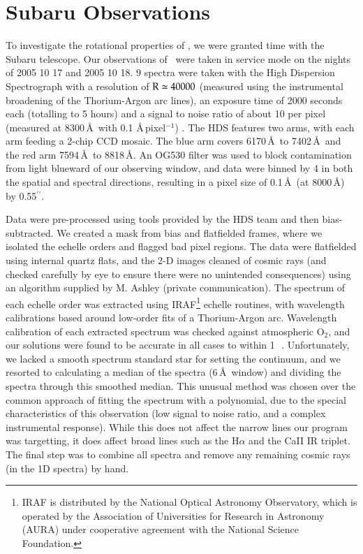 \section{Subaru Observations}
To investigate the rotational properties of \starg, we were granted time
with the Subaru telescope. Our observations of \starg\ were taken in
service mode on the nights of 2005 10 17 and 2005 10 18. 9
spectra were taken with the High Dispersion Spectrograph
\citep[HDS, ][]{1998SPIE.3355..354N} with a resolution of $\rm{R}\simeq40000$ (measured using the instrumental broadening of the Thorium-Argon arc lines), an
exposure time of 2000 seconds each (totalling to 5 hours) and a signal to noise ratio of about 10 per pixel (measured at $8300$\,\AA\ with 0.1 \AA\,pixel$^{-1}$) . The HDS
features two arms, with each arm feeding a 2-chip CCD mosaic. The blue
arm covers 6170\,\AA\ to 7402\,\AA\ and the red arm 7594\,\AA\ to
8818\,\AA. An OG530 filter was used to block contamination from light
blueward of our observing window, and data were binned by 4 in both
the spatial and spectral directions, resulting in a pixel size of
0.1\,\AA\ (at 8000\,\AA) by 0.55$^{\prime\prime}$.

Data were pre-processed using tools provided by the HDS team and then
bias-subtracted. We created a mask from bias and flatfielded frames,
where we isolated the echelle orders and flagged bad pixel
regions. The data were flatfielded using internal quartz flats, and the
2-D images cleaned of cosmic rays (and checked carefully by eye to
ensure there were no unintended consequences) using an algorithm
supplied by M. Ashley (private communication). The spectrum of each
echelle order was extracted using IRAF\footnote{IRAF is distributed by
the National Optical Astronomy Observatory, which is operated by the
Association of Universities for Research in Astronomy (AURA) under
cooperative agreement with the National Science Foundation.}  echelle
routines, with wavelength calibrations based around low-order fits of
a Thorium-Argon arc. Wavelength calibration of each extracted spectrum
was checked against atmospheric O$_2$, and our solutions were found to
be accurate in all cases to within 1\,\kms\
\citep{1985A&A...149..357C}. Unfortunately, we lacked a smooth
spectrum standard star for setting the continuum, and we resorted to
calculating a median of the spectra (6\,\AA\ window) and dividing the
spectra through this smoothed median. This unusual method was chosen
over the common approach of fitting the spectrum with a polynomial,
due to the special characteristics of this observation (low signal to noise ratio, and a complex instrumental response). While this does not affect the narrow lines our program was
targetting, it does affect broad lines such as the H$\alpha$ and the
CaII IR triplet. The final step was to combine all spectra and remove
any remaining cosmic rays (in the 1D spectra) by hand.

